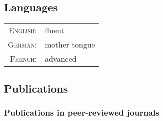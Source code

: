 \subsection*{Languages}
\begin{tabular}{rl}
	\textsc{English:}& fluent\\
	\textsc{German:}& mother tongue\\
	\textsc{French:}& advanced 
\end{tabular}

\subsection*{Publications}


\subsubsection*{Publications in peer-reviewed journals}

